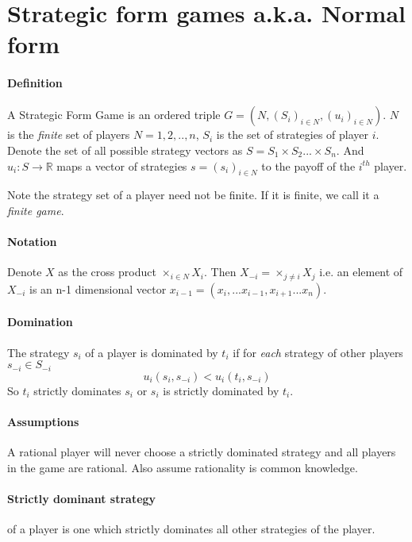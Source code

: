 \section{Strategic form games a.k.a. Normal form}
\paragraph{Definition} A Strategic Form Game is an ordered triple $G = (N, (S_i)_{i \in N}, (u_i)_{i \in N})$. $N$ is the \textit{finite} set of players $N = {1,2,..,n}$, $S_i$ is the set of strategies of player $i$. Denote the set of all possible strategy vectors as $S = S_1 \times S_2 ... \times S_n$. And $u_i: S \to \mathbb{R}$ maps a vector of strategies $s = (s_i)_{i \in N}$ to the payoff of the $i^{th}$ player. 

Note the strategy set of a player need not be finite. If it is finite, we call it a \textit{finite game}.

\paragraph{Notation} Denote $X$ as the cross product $\times_{i \in N}X_i$. Then $X_{-i} = \times_{j\neq i}X_j$ i.e. an element of $X_{-i}$ is an n-1 dimensional vector $x_{i-1} = (x_i, ... x_{i-1}, x_{i+1}... x_n)$.

\paragraph{Domination} The strategy $s_i$ of a player is dominated by $t_i$ if for \textit{each} strategy of other players $s_{-i} \in S_{-i}$ 
\[
    u_i(s_i, s_{-i}) < u_i(t_i, s_{-i})
\]
So $t_i$ strictly dominates $s_i$ or $s_i$ is strictly dominated by $t_i$.

\paragraph{Assumptions} A rational player will never choose a strictly dominated strategy and all players in the game are rational. Also assume rationality is common knowledge.

\paragraph{Strictly dominant strategy} of a player is one which strictly dominates all other strategies of the player.
